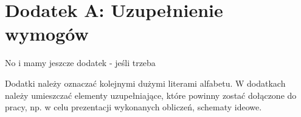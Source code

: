 
\chapter*{Dodatek A: Uzupełnienie wymogów}

No i mamy jeszcze dodatek - jeśli trzeba

Dodatki należy oznaczać kolejnymi dużymi literami alfabetu. W dodatkach należy umieszczać elementy uzupełniające, które powinny zostać dołączone do pracy, np. w celu prezentacji wykonanych obliczeń, schematy ideowe.